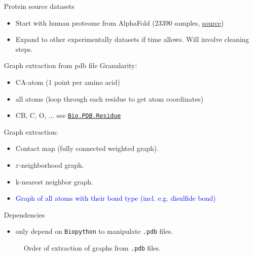 \documentclass[aspectratio=169, 10pt, dvipsnames, handout]{beamer}
\begin{document}
\begin{frame}[fragile]{Protein source datasets}
  \begin{itemize}
  \item Start with human proteome from AlphaFold (23390 samples,
    \href{https://ftp.ebi.ac.uk/pub/databases/alphafold/latest/UP000005640_9606_HUMAN_v2.tar}{source})
  \item Expand to other experimentally datasets if time allows. Will involve cleaning steps.
  \end{itemize}
\end{frame}

\begin{frame}[fragile]{Graph extraction from pdb file}
  Granularity:
  \begin{itemize}
  \item CA-atom (1 point per amino acid)
  \item all atoms (loop through each residue to get atom coordinates)
  \item CB, C, O, ... see \href{https://biopython.org/docs/1.75/api/Bio.PDB.Residue.html}{\texttt{Bio.PDB.Residue}}
  \end{itemize}
  Graph extraction:
  \begin{itemize}
  \item Contact map (fully connected weighted graph).
  \item $\varepsilon$-neighborhood graph. \cite{anastasiu2016algorithms}
  \item k-nearest neighbor graph. \cite{zhao2021approximate}
  \item \textcolor{blue}{Graph of all atoms with their bond type (incl. e.g. disulfide bond)}

  \end{itemize}

  Dependencies
  \begin{itemize}
  \item only depend on \texttt{Biopython} to manipulate \texttt{.pdb} files.
  \end{itemize}
  \endminipage
    \begin{figure}[center]
    \centering
    \caption{Order of extraction of graphs from \texttt{.pdb} files.}
    \label{fig:overview}
  \end{figure}
  \endminipage

\end{frame}
\end{document}
